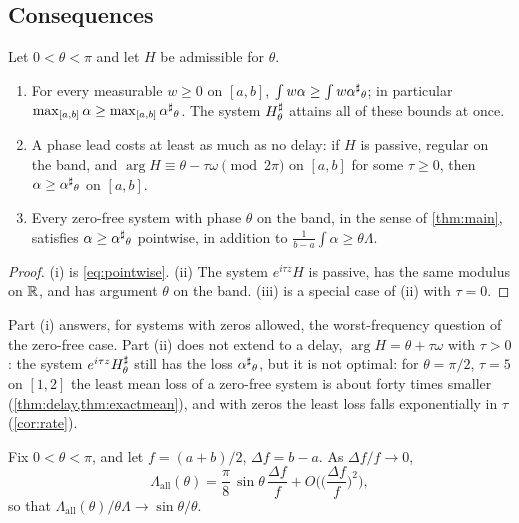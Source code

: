 \subsection{Consequences}

\begin{corollary}\label{cor:allweights}
Let $0<\theta<\pi$ and let $H$ be admissible for $\theta$.
\begin{enumerate}
\item[(i)] For every measurable $w\ge0$ on $[a,b]$,
$\int w\alpha\ge\int w{\alpha^{\sharp}}_\theta$; in particular
$\max_{[a,b]}\alpha\ge\max_{[a,b]}{\alpha^{\sharp}}_\theta$. The system $H^{\sharp}_\theta$ attains all of
these bounds at once.
\item[(ii)] A phase lead costs at least as much as no delay: if $H$ is
passive, regular on the band, and $\arg H\equiv\theta-\tau\omega\pmod{2\pi}$ on
$[a,b]$ for some $\tau\ge0$, then $\alpha\ge{\alpha^{\sharp}}_\theta$ on $[a,b]$.
\item[(iii)] Every zero-free system with phase $\theta$ on the band, in the
sense of \cref{thm:main}, satisfies $\alpha\ge{\alpha^{\sharp}}_\theta$ pointwise, in addition
to $\frac1{b-a}\int\alpha\ge\theta\Lambda$.
\end{enumerate}
\end{corollary}

\begin{proof}
(i) is \eqref{eq:pointwise}. (ii) The system $e^{i\tau z}H$ is passive, has
the same modulus on $\mathbb R$, and has argument $\theta$ on the band. (iii) is a
special case of (ii) with $\tau=0$.
\end{proof}

Part (i) answers, for systems with zeros allowed, the worst-frequency
question of the zero-free case. Part
(ii) does not extend to a delay, $\arg H=\theta+\tau\omega$ with $\tau>0$: the
system $e^{i\tau z}H^{\sharp}_\theta$ still has the loss ${\alpha^{\sharp}}_\theta$, but it is not
optimal: for $\theta=\pi/2$, $\tau=5$ on $[1,2]$ the least mean loss of a
zero-free system is about forty times smaller (\cref{thm:delay,thm:exactmean}),
and with zeros the least loss falls exponentially in $\tau$ (\cref{cor:rate}).

\begin{corollary}\label{cor:narrowzeros}
Fix $0<\theta<\pi$, and let $f=(a+b)/2$, $\Delta f=b-a$. As $\Delta f/f\to0$,
\[
\Lambda_{\mathrm{all}}(\theta)=\frac\pi8\,\sin\theta\,\frac{\Delta f}f
+O\Big(\Big(\frac{\Delta f}f\Big)^2\Big),
\]
so that $\Lambda_{\mathrm{all}}(\theta)/\theta\Lambda\to\sin\theta/\theta$.
\end{corollary}

